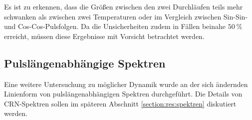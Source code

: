 Es ist zu erkennen, dass die Größen zwischen den zwei Durchläufen teils mehr schwanken als zwischen zwei Temperaturen oder im Vergleich zwischen Sin-Sin- und Cos-Cos-Pulsfolgen. Da die Unsicherheiten zudem in Fällen beinahe $\SI{50}{\percent}$ erreicht, müssen diese Ergebnisse mit Vorsicht betrachtet werden.



\subsection{Pulslängenabhängige Spektren} \label{section:res:spekdyn}

Eine weitere Untersuchung zu möglicher Dynamik wurde an der sich ändernden Linienform von pulslängenabhängigen Spektren durchgeführt. Die Details von CRN-Spektren sollen im späteren Abschnitt \ref{section:res:spektren} diskutiert werden.

